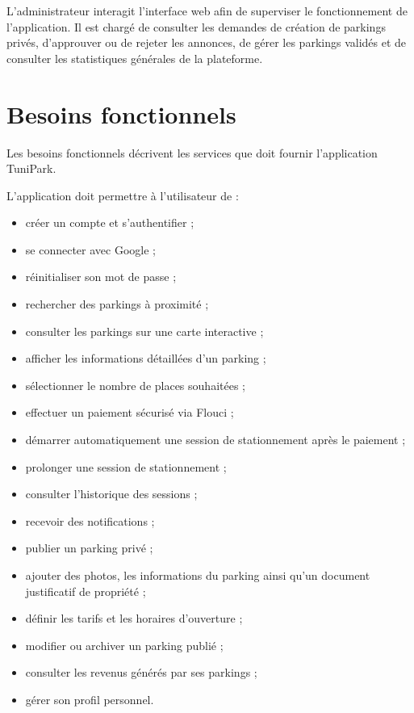 \par L'administrateur interagit  l'interface web afin de superviser le fonctionnement de l'application. Il est chargé de consulter les demandes de création de parkings privés, d'approuver ou de rejeter les annonces, de gérer les parkings validés et de consulter les statistiques générales de la plateforme.

\section{Besoins fonctionnels}

\par Les besoins fonctionnels décrivent les services que doit fournir l'application TuniPark.

\par L'application doit permettre à l'utilisateur de :

\begin{itemize}
    \item créer un compte et s'authentifier ;
    \item se connecter avec Google ;
    \item réinitialiser son mot de passe ;
    \item rechercher des parkings à proximité ;
    \item consulter les parkings sur une carte interactive ;
    \item afficher les informations détaillées d'un parking ;
    \item sélectionner le nombre de places souhaitées ;
    \item effectuer un paiement sécurisé via Flouci ;
    \item démarrer automatiquement une session de stationnement après le paiement ;
    \item prolonger une session de stationnement ;
    \item consulter l'historique des sessions ;
    \item recevoir des notifications ;
    \item publier un parking privé ;
    \item ajouter des photos, les informations du parking ainsi qu'un document justificatif de propriété ;
    \item définir les tarifs et les horaires d'ouverture ;
    \item modifier ou archiver un parking publié ;
    \item consulter les revenus générés par ses parkings ;
    \item gérer son profil personnel.
\end{itemize}


